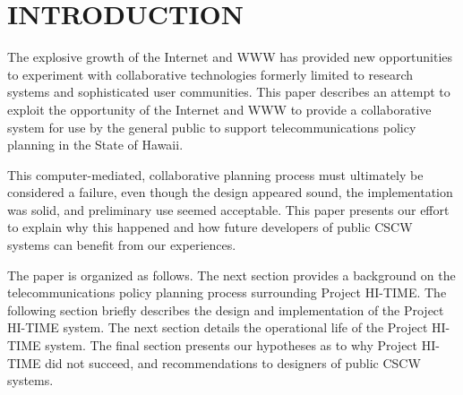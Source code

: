 
\section{INTRODUCTION}


The explosive growth of the Internet and WWW has provided new opportunities
to experiment with collaborative technologies formerly limited to research
systems and sophisticated user communities.  This paper describes an
attempt to exploit the opportunity of the Internet and WWW to provide a
collaborative system for use by the general public to support
telecommunications policy planning in the State of Hawaii.

This computer-mediated, collaborative planning process must ultimately be
considered a failure, even though the design appeared sound, the
implementation was solid, and preliminary use seemed acceptable.  This
paper presents our effort to explain why this happened and how future
developers of public CSCW systems can benefit from our experiences.
 
The paper is organized as follows. The next section provides a background
on the telecommunications policy planning process surrounding Project
HI-TIME. The following section briefly describes the design and
implementation of the Project HI-TIME system.  The next section details the
operational life of the Project HI-TIME system. The final section
presents our hypotheses as to why Project HI-TIME did not succeed, and 
recommendations to designers of public CSCW systems.

